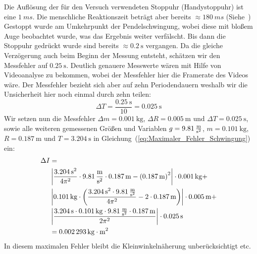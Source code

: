 \documentclass{article}
\begin{document}
				Die Auflösung der für den Versuch verwendeten Stoppuhr (Handystoppuhr) ist eine \(\SI{1}{ms}\).
				Die menschliche Reaktionszeit beträgt aber bereits \(\approx \SI{180}{ms} \) (Siehe~\cite{Reaktionszeit})
				Gestoppt wurde am Umkehrpunkt der Pendelschwingung, wobei diese mit bloßem Auge beobachtet wurde, was das Ergebnis weiter verfälscht.
				Bis dann die Stoppuhr gedrückt wurde sind bereits \(\approx \SI{0,2}{\second}\) vergangen.
				Da die gleiche Verzögerung auch beim Beginn der Messung entsteht, schätzen wir den Messfehler auf \(\SI{0,25}{\second}\).
				Deutlich genauere Messwerte wären mit Hilfe von Videoanalyse zu bekommen, wobei der Messfehler hier die Framerate des Videos wäre.
				Der Messfehler bezieht sich aber auf zehn Periodendauern weshalb wir die Unsicherheit hier noch einmal durch zehn teilen:
				\begin{equation}
					\Delta T = \frac{\SI{0,25}{\second}}{10} = \SI{0,025}{\second}
				\end{equation} 
				Wir setzen nun die Messfehler \( \Delta m = \SI{0,001}{\kilogram} \), \( \Delta R = \SI{0,005}{\metre} \) und \(\Delta T = \SI{0,025}{\second} \), sowie alle weiteren gemessenen Größen und Variablen
				\(g = \SI{9,81}{\frac{\metre}{\second^2}} \), \(m = \SI{0,101}{\kilogram} \), \(R = \SI{0,187}{\metre} \) und \( T = \SI{3,204}{\second} \) in Gleichung~(\ref{eq:Maximaler_Fehler_Schwingung}) ein:
				\begin{equation}
					\begin{aligned}
						\Delta I &= \\
						&\left| \frac{ {\SI{3,204}{\second}}^2 }{4 \pi^2} \cdot \SI{9,81}{\frac{\metre}{\second^2}} \cdot \SI{0,187}{\metre} - {\left(\SI{0,187}{\metre}\right)}^2 \right| \cdot \SI{0,001}{\kilogram} + \\
						&\left| \SI{0,101}{\kilogram} \cdot \left( \frac{ {\SI{3,204}{\second}}^2 \cdot \SI{9,81}{\frac{\metre}{\second^2}} }{4 \pi^2} - 2 \cdot \SI{0,187}{\metre} \right) \right| \cdot \SI{0,005}{\metre} + \\
						&\left| \frac{ \SI{3,204}{\second} \cdot \SI{0,101}{\kilogram} \cdot \SI{9,81}{\frac{\metre}{\second^2}} \cdot \SI{0,187}{\metre} }{2 \pi^2 } \right| \cdot \SI{0,025}{\second} \\
						&= \SI{0.002293}{ \kilogram \cdot \metre^2 }
					\end{aligned}
				\end{equation}
				In diesem maximalen Fehler bleibt die Kleinwinkelnäherung unberücksichtigt etc.
\end{document}

